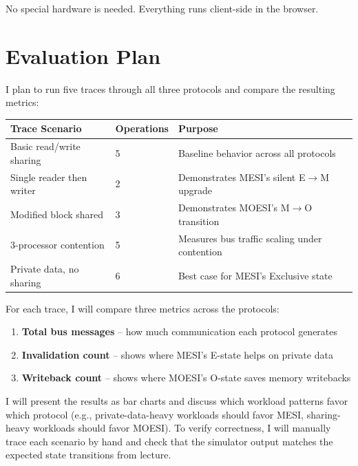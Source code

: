 \documentclass[11pt]{article}
\begin{document}
No special hardware is needed. Everything runs client-side in the browser.

\section{Evaluation Plan}

I plan to run five traces through all three protocols and compare the resulting metrics:

\begin{table}[h]
\centering
\small
\begin{tabular}{@{}lll@{}}
\toprule
\textbf{Trace Scenario} & \textbf{Operations} & \textbf{Purpose} \\
\midrule
Basic read/write sharing & 5 & Baseline behavior across all protocols \\
Single reader then writer & 2 & Demonstrates MESI's silent E$\to$M upgrade \\
Modified block shared & 3 & Demonstrates MOESI's M$\to$O transition \\
3-processor contention & 5 & Measures bus traffic scaling under contention \\
Private data, no sharing & 6 & Best case for MESI's Exclusive state \\
\bottomrule
\end{tabular}
\end{table}

For each trace, I will compare three metrics across the protocols:
\begin{enumerate}[nosep]
    \item \textbf{Total bus messages} -- how much communication each protocol generates
    \item \textbf{Invalidation count} -- shows where MESI's E-state helps on private data
    \item \textbf{Writeback count} -- shows where MOESI's O-state saves memory writebacks
\end{enumerate}

I will present the results as bar charts and discuss which workload patterns favor which protocol (e.g., private-data-heavy workloads should favor MESI, sharing-heavy workloads should favor MOESI). To verify correctness, I will manually trace each scenario by hand and check that the simulator output matches the expected state transitions from lecture.
\end{document}
